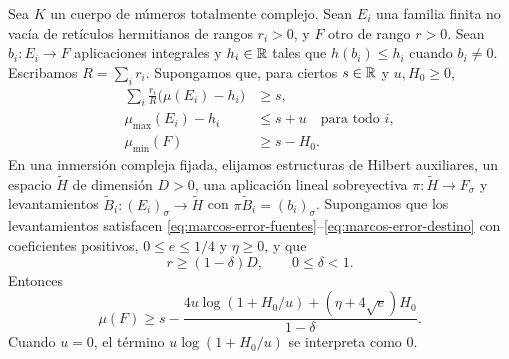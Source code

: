 \begin{teorema}
Sea $K$ un cuerpo de números totalmente complejo. Sean $E_i$ una
familia finita no vacía de retículos hermitianos de rangos $r_i>0$,
y $F$ otro de rango $r>0$. Sean $b_i:E_i\to F$ aplicaciones
integrales y $h_i\in\mathbb{R}$ tales que $h(b_i)\le h_i$ cuando $b_i\ne0$.
Escribamos $R=\sum_i r_i$. Supongamos que, para ciertos
$s\in\mathbb{R}$ y $u,H_0\ge0$,
\begin{align}
 \sum_i\frac{r_i}{R}\bigl(\mu(E_i)-h_i\bigr)&\ge s,
                   \label{eq:marcos-hip-media}\\
 \mu_{\max}(E_i)-h_i&\le s+u\quad\text{para todo }i,
                   \label{eq:marcos-hip-max}\\
 \mu_{\min}(F)&\ge s-H_0.
                   \label{eq:marcos-hip-min}
\end{align}
En una inmersión compleja fijada, elijamos estructuras de Hilbert
auxiliares, un espacio $\widetilde H$ de dimensión $D>0$, una
aplicación lineal sobreyectiva $\pi:\widetilde H\to F_\sigma$ y
levantamientos $\widetilde B_i:(E_i)_\sigma\to\widetilde H$ con
$\pi\widetilde B_i=(b_i)_\sigma$.
Supongamos que los levantamientos satisfacen
\eqref{eq:marcos-error-fuentes}--\eqref{eq:marcos-error-destino}
con coeficientes positivos, $0\le e\le1/4$ y $\eta\ge0$, y que
\begin{equation}
 r\ge(1-\delta)D,\qquad 0\le\delta<1.
 \label{eq:marcos-hip-proyeccion}
\end{equation}
Entonces
\begin{equation}
 \boxed{\quad
 \mu(F)\ge s-
 \frac{4u\log(1+H_0/u)+(\eta+4\sqrt e)H_0}{1-\delta}.
 \quad}
 \label{eq:marcos-transferencia}
\end{equation}
Cuando $u=0$, el término $u\log(1+H_0/u)$ se interpreta como $0$.
\label{teo:marcos-transferencia}
\end{teorema}

